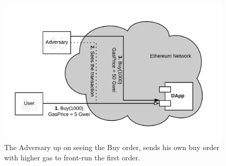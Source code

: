 \begin{figure}[h]
\centering
\includegraphics[width=0.7\linewidth]{figures/Regular_frontrunning.png}
\caption{The Adversary up on seeing the Buy order, sends his own buy order with higher gas to front-run the first order. \label{fig:RegularFrontrunning}} 
\end{figure}

